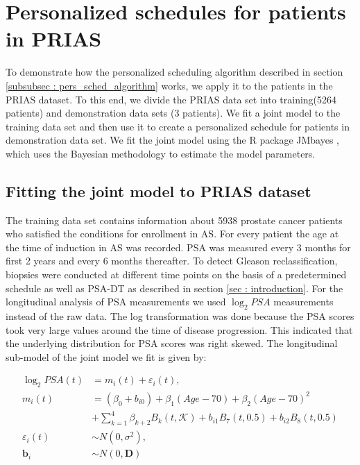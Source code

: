 
\section{Personalized schedules for patients in PRIAS}
\label{sec : pers_schedule_PRIAS}
To demonstrate how the personalized scheduling algorithm described in section \ref{subsubsec : pers_sched_algorithm} works, we apply it to the patients in the PRIAS dataset. To this end, we divide the PRIAS data set into training(5264 patients) and demonstration data sets (3 patients). We fit a joint model to the training data set and then use it to create a personalized schedule for patients in demonstration data set. We fit the joint model using the R package JMbayes \citep{rizopoulosJMbayes}, which uses the Bayesian methodology to estimate the model parameters.

\subsection{Fitting the joint model to PRIAS dataset}
\label{subsec : jm_fit_prias}
The training data set contains information about 5938 prostate cancer patients who satisfied the conditions for enrollment in AS. For every patient the age at the time of induction in AS was recorded. PSA was measured every 3 months for first 2 years and every 6 months thereafter. To detect Gleason reclassification, biopsies were conducted at different time points on the basis of a predetermined schedule as well as PSA-DT as described in section \ref{sec : introduction}. For the longitudinal analysis of PSA measurements we used $\log_2 PSA$ measurements instead of the raw data. The log transformation was done because the PSA scores took very large values around the time of disease progression. This indicated that the underlying distribution for PSA scores was right skewed. The longitudinal sub-model of the joint model we fit is given by:

\begin{align*}
\log_2 PSA(t) &= m_i(t) + \varepsilon_i(t), \\
m_i(t) &= (\beta_0 + b_{i0}) + \beta_1 (Age-70) + \beta_2 (Age-70)^2\\ 
&+ \sum_{k=1}^4 \beta_{k+2} B_k(t,\mathcal{K}) + b_{i1} B_7(t, 0.5) + b_{i2} B_8(t, 0.5) \\
\varepsilon_i(t) & \sim N(0, \sigma^2),\\
\boldsymbol{b}_i & \sim N(0, \boldsymbol{D})
\end{align*}

